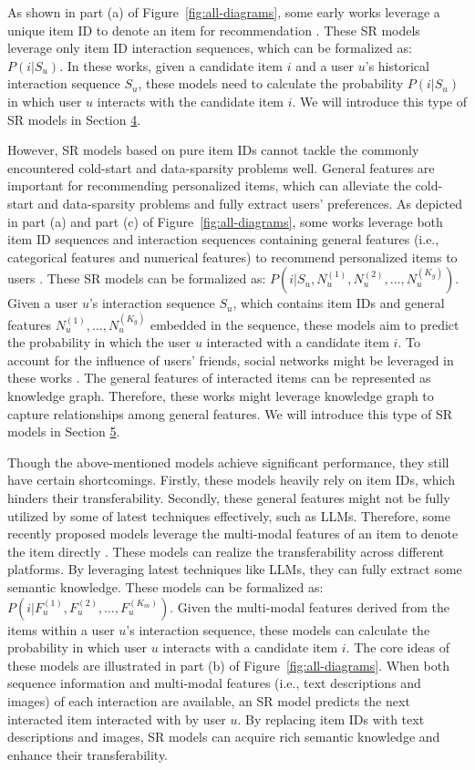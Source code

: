 \documentclass[review]{fcs}
\begin{document}
	As shown in part (a) of Figure~\ref{fig:all-diagrams}, some early works leverage a unique item ID to denote an item for recommendation \cite{SASRec, GRU4Rec}. These SR models leverage only item ID interaction sequences, which can be formalized as: $P(i|S_{u})$. In these works, given a candidate item $i$ and a user $u$'s historical interaction sequence $S_{u}$, these models need to calculate the probability $P(i|S_{u})$ in which user $u$ interacts with the candidate item $i$. We will introduce this type of SR models in Section \hyperref[sec:pure_ID_based_SR]{4}.
	
	However, SR models based on pure item IDs cannot tackle the commonly encountered cold-start and data-sparsity problems well. General features are important for recommending personalized items, which can alleviate the cold-start and data-sparsity problems and fully extract users' preferences. As depicted in part (a) and part (c) of Figure~\ref{fig:all-diagrams}, some works leverage both item ID sequences and interaction sequences containing general features (i.e., categorical features and numerical features) to recommend personalized items to users \cite{DIF-SR, NOVA}. These SR models can be formalized as: $P(i|S_{u}, N_{u}^{(1)}, N_{u}^{(2)}, \ldots, N_{u}^{(K_{g})})$. Given a user $u$'s interaction sequence $S_{u}$, which contains item IDs and general features $N_{u}^{(1)}, \ldots, N_{u}^{(K_{g})}$ embedded in the sequence, these models aim to predict the probability in which the user $u$ interacted with a candidate item $i$. To account for the influence of users' friends, social networks might be leveraged in these works \cite{STEN}. The general features of interacted items can be represented as knowledge graph. Therefore, these works might leverage knowledge graph to capture relationships among general features. We will introduce this type of SR models in Section \hyperref[sec:SR_with_side_information]{5}.
	
	Though the above-mentioned models achieve significant performance, they still have certain shortcomings. Firstly, these models heavily rely on item IDs, which hinders their transferability. Secondly, these general features might not be fully utilized by some of latest techniques effectively, such as LLMs. Therefore, some recently proposed models leverage the multi-modal features of an item to denote the item directly \cite{UniSRec, VQ-Rec}. These models can realize the transferability across different platforms. By leveraging latest techniques like LLMs, they can fully extract some semantic knowledge. These models can be formalized as: $P(i|F_{u}^{(1)}, F_{u}^{(2)}, \ldots, F_{u}^{(K_{m})})$. Given the multi-modal features derived from the items within a user $u$'s interaction sequence, these models can calculate the probability in which user $u$ interacts with a candidate item $i$. The core ideas of these models are illustrated in part (b) of Figure~\ref{fig:all-diagrams}. When both sequence information and multi-modal features (i.e., text descriptions and images) of each interaction are available, an SR model predicts the next interacted item interacted with by user $u$. By replacing item IDs with text descriptions and images, SR models can acquire rich semantic knowledge and enhance their transferability.
	
\end{document}
